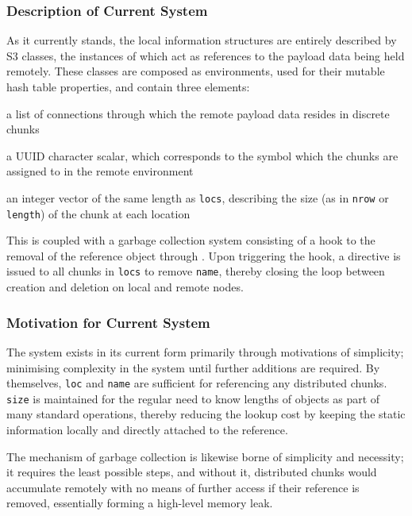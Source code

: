\subsubsection{Description of Current System}\label{description-of-current-system}

As it currently stands, the local information structures are entirely described by S3 classes, the instances of which act as references to the payload data being held remotely.
These classes are composed as environments, used for their mutable hash table properties, and contain three elements:

\begin{description} \tightlist \item[\texttt{locs}] a list of  connections through which the remote payload data resides in discrete chunks \item[\texttt{name}] a UUID character scalar, which corresponds to the symbol which the chunks are assigned to in the remote environment \item[\texttt{size}] an integer vector of the same length as \texttt{locs}, describing the size (as in \texttt{nrow} or \texttt{length}) of the chunk at each location \end{description}

This is coupled with a garbage collection system consisting of a hook to the removal of the reference object through .
Upon triggering the hook, a directive is issued to all chunks in \texttt{locs} to remove \texttt{name}, thereby closing the loop between creation and deletion on local and remote nodes.

\subsubsection{Motivation for Current System}\label{motivation-for-current-system}

The system exists in its current form primarily through motivations of simplicity; minimising complexity in the system until further additions are required.
By themselves, \texttt{loc} and \texttt{name} are sufficient for referencing any distributed chunks.
\texttt{size} is
maintained for the regular need to know lengths of objects as part of
many standard operations, thereby reducing the lookup cost by keeping
the static information locally and directly attached to the reference.

The mechanism of garbage collection is likewise borne of simplicity and necessity; it requires the least possible steps, and without it, distributed chunks would accumulate remotely with no means of further access if their reference is removed, essentially forming a high-level memory leak.

